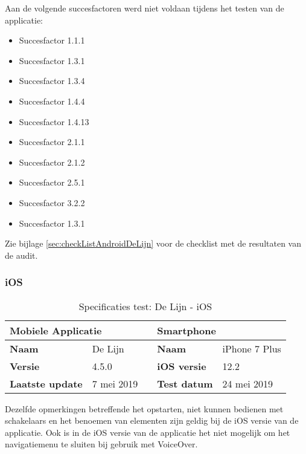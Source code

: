 Aan de volgende succesfactoren werd niet voldaan tijdens het testen van de applicatie: \begin{itemize}
    \item Succesfactor 1.1.1
    \item Succesfactor 1.3.1
    \item Succesfactor 1.3.4
        \item Succesfactor 1.4.4
            \item Succesfactor 1.4.13
                \item Succesfactor 2.1.1
                    \item Succesfactor 2.1.2
                        \item Succesfactor 2.5.1
                            \item Succesfactor 3.2.2
                                \item Succesfactor 1.3.1
\end{itemize}

Zie bijlage \ref{sec:checkListAndroidDeLijn} voor de checklist met de resultaten van de audit.

\subsubsection{iOS}
\begin{table} [H]
    \centering
    \caption{Specificaties test: De Lijn - iOS}
    \begin{tabular}{|l|l|l|l|l|} 
        \hline
        \multicolumn{2}{|l|}{\textbf{Mobiele Applicatie } } &  & \multicolumn{2}{l|}{\textbf{Smartphone }}  \\ 
        \hline
        \textbf{Naam}           & De Lijn                   &  & \textbf{Naam}           & iPhone 7 Plus         \\ 
        \hline
        \textbf{Versie}         & 4.5.0                     &  & \textbf{iOS versie} & 12.2           \\ 
        \hline
        \textbf{Laatste update} & 7 mei 2019               &  & \textbf{Test datum}     & 24 mei 2019      \\
        \hline
    \end{tabular}
\end{table}

Dezelfde opmerkingen betreffende het opstarten, niet kunnen bedienen met schakelaars en het benoemen van elementen zijn geldig bij de iOS versie van de applicatie. Ook is in de iOS versie van de applicatie het niet mogelijk om het navigatiemenu te sluiten bij gebruik met VoiceOver.

